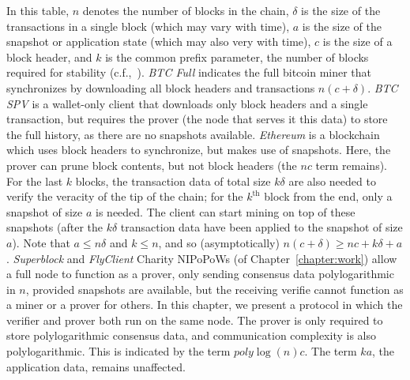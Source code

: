 In this table, $n$ denotes the number of blocks in the chain, $\delta$ is the size of the
transactions in a single block (which may vary with time), $a$ is the size of the snapshot
or application state (which may also very with time), $c$ is the size of a block header, and
$k$ is the common prefix parameter, the number of blocks required for stability
(c.f.,~\cite{wallet-taxonomy}).
\emph{BTC Full} indicates the full bitcoin miner that synchronizes by downloading all
block headers and transactions $n(c + \delta)$.
\emph{BTC SPV} is a wallet-only client that downloads
only block headers and a single transaction, but requires the prover (the node that
serves it this data) to store the full history, as there are no snapshots available.
\emph{Ethereum} is a blockchain which uses block headers to synchronize, but makes use of
snapshots. Here, the prover can prune block contents, but not block headers (the $nc$ term
remains). For the last $k$ blocks, the transaction data of total size $k\delta$ are also needed to
verify the veracity of the tip of the chain; for the $k^\text{th}$ block from the end, only a
snapshot of size $a$ is needed.
The client can start mining on top of these snapshots (after the $k\delta$ transaction
data have been applied to the snapshot of size $a$).
Note that $a \leq n\delta$ and $k \leq n$, and so (asymptotically) $n(c + \delta) \geq nc + k\delta + a$.
\emph{Superblock} and \emph{FlyClient}
Charity NIPoPoWs (of Chapter~\ref{chapter:work}) allow a full node to function as a prover,
only sending consensus data
polylogarithmic in $n$, provided snapshots are available, but the receiving verifie
cannot function as a miner or a prover for others. In this chapter, we present a protocol
in which the verifier and prover both run on the same node. The prover is only required to store
polylogarithmic consensus data, and communication complexity is also polylogarithmic.
This is indicated by the term $poly\log(n)c$. The term $ka$, the application data,
remains unaffected.

